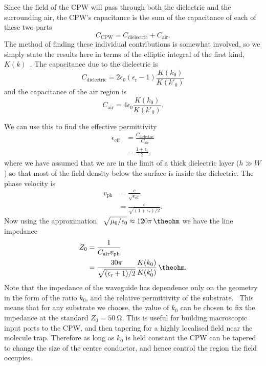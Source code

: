 Since the field of the CPW will pass through both the dielectric and the
surrounding air, the CPW's capacitance is the sum of the capacitance of each of
these two parts
%
\begin{equation}
  C_\text{CPW} = C_\text{dielectric} + C_\text{air}.
\end{equation}
%
The method of finding these individual contributions is somewhat involved, so
we simply state the results here in terms of the elliptic integral of the
first kind, $K(k)$~\cite{Simons2004}. The capacitance due to the dielectric is
%
%
\begin{equation}
  C_\text{dielectric} = 2\epsilon_0(\epsilon_\text{r}-1)\frac{K(k_0)}{K(k'_0)}
\end{equation}
%
and the capacitance of the air region is
%
\begin{equation}
  C_\text{air} = 4\epsilon_0 \frac{K(k_0)}{K(k'_0)}.
\end{equation}

We can use this to find the effective permittivity~\cite{Simons2004}
%
\begin{align}
  \epsilon_\text{eff} &= \frac{C_\text{dielectric}}{C_\text{air}} \\
    &= \frac{1+ \epsilon_\text{r}}{2},
\end{align}
%
where we have assumed that we are in the limit of a thick dielectric layer ($h
\gg W$) so that most of the field density below the surface is inside the
dielectric.
%
The phase velocity  is~\cite{Simons2004}
%
\begin{align}
  v_\text{ph} &= \frac{c}{\sqrt{\epsilon_\text{eff}}} \\
    &= \frac{c}{\sqrt{(1 + \epsilon_\text{r})/2}}.
\end{align}
%
Now using the approximation~\cite{Collin2007}
$\sqrt{\mu_0/\epsilon_0}\approx120\pi\,\si{\theohm}$ we have the line
impedance~\cite{Simons2004}
\begin{align}
  Z_0 &= \frac{1}{C_\text{air} v_\text{ph}} \\
    &= \frac{30 \pi}{\sqrt{(\epsilon_\text{r}+1)/2}} \frac{K(k_0)}{K(k'_0)}\,
    \si{\theohm}.
    \label{mws:eqn:Z0}
\end{align}
Note that the impedance of the waveguide has dependence only on the geometry in
the form of the ratio $k_0$, and the relative permittivity of the
substrate.~\cite{Simons2004} This means that for any substrate we choose, the
value of $k_0$ can be chosen to fix the impedance at the standard $Z_0 =
\SI{50}{\ohm}$. This is useful for building macroscopic input ports to the CPW,
and then tapering for a highly localised field near the molecule trap.
%
Therefore as long as $k_0$ is held constant the CPW can be tapered to change the
size of the centre conductor, and hence control the region the field occupies.

